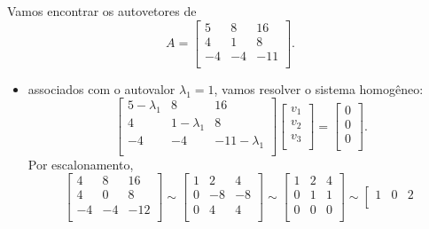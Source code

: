\documentclass[../livro.tex]{subfiles}  %
\begin{document}
\begin{example}
	Vamos encontrar os autovetores de
	\[
	A =
	\left[
	\begin{array}{ccc}
	5 & 8 & 16 \\
	4 & 1 & 8 \\
	-4 & -4 & -11 \\
	\end{array}
	\right].
	\]
	
	\begin{itemize}
		\item associados com o autovalor $\lambda_1 = 1$, vamos resolver o sistema homogêneo:
		\[
		\left[
		\begin{array}{ccc}
		5-\lambda_1 & 8 & 16 \\
		4 & 1-\lambda_1 & 8 \\
		-4 & -4 & -11-\lambda_1 \\
		\end{array}
		\right] \left[
		\begin{array}{ccc}
		v_1 \\
		v_2 \\
		v_3 \\
		\end{array}
		\right] = \left[
		\begin{array}{ccc}
		0 \\
		0 \\
		0 \\
		\end{array}
		\right].
		\] Por escalonamento,
		\[
		\left[
		\begin{array}{ccc}
		4 &  8 & 16 \\
		4 &  0 & 8 \\
		-4 & -4 & -12 \\
		\end{array}
		\right] \sim \left[
		\begin{array}{ccc}
		1 &  2 & 4 \\
		0 & -8 & -8 \\
		0 &  4 & 4 \\
		\end{array}
		\right] \sim \left[
		\begin{array}{ccc}
		1 &  2 & 4 \\
		0 &  1 & 1 \\
		0 &  0 & 0 \\
		\end{array}
		\right] \sim \left[
		\begin{array}{ccc}
		1 &  0 & 2 \\

\end{array}\]
\end{itemize}
\end{example}
\end{document}
